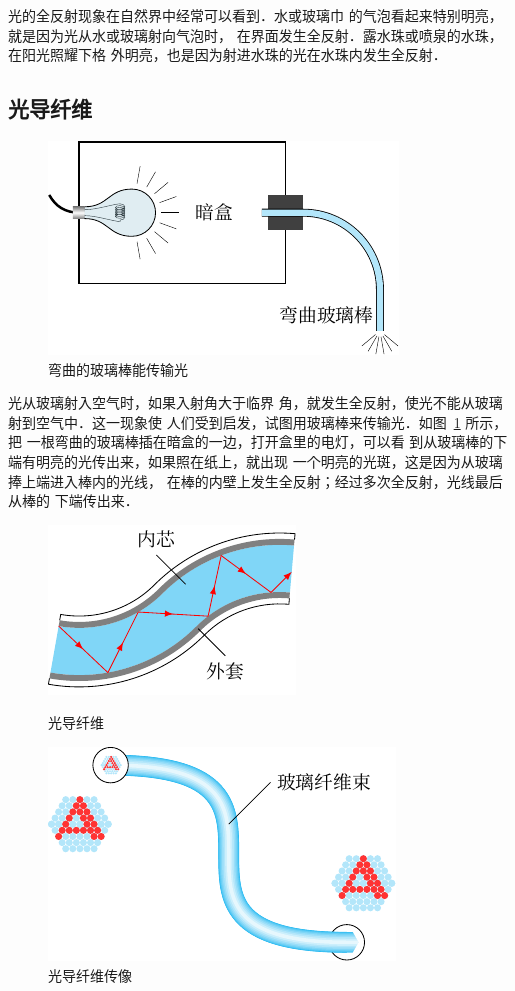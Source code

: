 光的全反射现象在自然界中经常可以看到．水或玻璃巾
的气泡看起来特别明亮，就是因为光从水或玻璃射向气泡时，
在界面发生全反射．露水珠或喷泉的水珠，在阳光照耀下格
外明亮，也是因为射进水珠的光在水珠内发生全反射．

\subsection{光导纤维}
\begin{figure}[htbp]
    \centering
    \includegraphics{fig/C/5-24.pdf}
    \caption{弯曲的玻璃棒能传输光}\label{fig_C_5-24}
\end{figure}

光从玻璃射入空气时，如果入射角大于临界
角，就发生全反射，使光不能从玻璃射到空气中．这一现象使
人们受到启发，试图用玻璃棒来传输光．如图~\ref{fig_C_5-24} 所示，把
一根弯曲的玻璃棒插在暗盒的一边，打开盒里的电灯，可以看
到从玻璃棒的下端有明亮的光传出来，如果照在纸上，就出现
一个明亮的光斑，这是因为从玻璃捧上端进入棒内的光线，
在棒的内壁上发生全反射；经过多次全反射，光线最后从棒的
下端传出来．
\begin{figure}[htbp]\centering
    \begin{minipage}[t]{0.48\textwidth}
        \centering
        \includegraphics{fig/C/5-25.pdf}
        \caption{光导纤维}\label{fig_C_5-25}
    \end{minipage}
    \begin{minipage}[t]{0.48\textwidth}
        \centering
        \includegraphics{fig/C/5-26.pdf}
        \caption{光导纤维传像}\label{fig_C_5-26}
    \end{minipage}
\end{figure}

